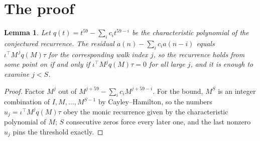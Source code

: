 \documentclass[11pt,a4paper]{article}
\theoremstyle{plain}
\newtheorem{lemma}[theorem]{Lemma}
\theoremstyle{definition}
\begin{document}
\section{The proof}

\begin{lemma}\label{lem:crit}
Let $q(t)=t^{59}-\sum_i c_it^{59-i}$ be the characteristic polynomial of the
conjectured recurrence. The residual $a(n)-\sum_ic_ia(n-i)$ equals
$\iota^{\!\top}M^{\,j}q(M)\tau$ for the corresponding walk index $j$, so the recurrence
holds from some point on if and only if $\iota^{\!\top}M^{j}q(M)\tau=0$ for all large $j$,
and it is enough to examine $j<S$.
\end{lemma}

\begin{proof}
Factor $M^{j}$ out of $M^{j+59}-\sum_ic_iM^{j+59-i}$. For the bound, $M^{S}$
is an integer combination of $I,M,\dots,M^{S-1}$ by Cayley--Hamilton, so the numbers
$u_j=\iota^{\!\top}M^{j}q(M)\tau$ obey the monic recurrence given by the characteristic
polynomial of $M$; $S$ consecutive zeros force every later one, and the last nonzero $u_j$
pins the threshold exactly.
\end{proof}
\end{document}

